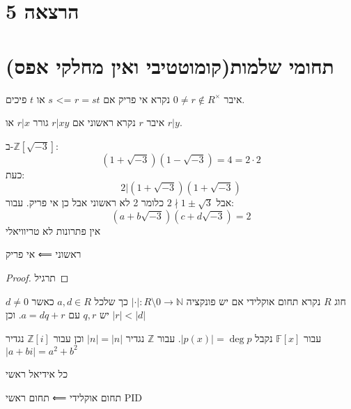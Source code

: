 \documentclass{tstextbook}
\begin{document}
\section{הרצאה 5}

\section{תחומי שלמות(קומוטטיבי ואין מחלקי אפס)}

\begin{definition}[אי פריק]
איבר \(0\neq r \not\in R^{\times}\) נקרא אי פריק אם \(r=st\) => \(s\) או \(t\) פיכים.

\end{definition}
\begin{definition}[ראשוני]
איבר \(r\) נקרא ראשוני אם \(r|xy\) גורר \(r|x\) או \(r|y\).

\end{definition}
\begin{example}
ב-\(\mathbb{Z}[\sqrt{ -3 }]\):
$$(1+\sqrt{ -3 })(1-\sqrt{ -3 })=4=2\cdot 2$$
כעת:
$$2|(1+\sqrt{ -3 })(1+\sqrt{ -3 })$$
אבל \(2\nmid 1\pm \sqrt{ 3 }\) כלומר 2 לא ראשוני אבל כן אי פריק. עבור:
$$(a+b\sqrt{ -3 })(c+d\sqrt{ -3 })=2$$
אין פתרונות לא טריוויאלי

\end{example}
\begin{proposition}
ראשוני ⟸ אי פריק

\end{proposition}
\begin{proof}
תרגיל

\end{proof}
\begin{definition}
חוג \(R\) נקרא תחום אוקלידי אם יש פונקציה \(\lvert \cdot \rvert:R\setminus 0 \to \mathbb{N}\) כך שלכל \(a,d \in R\) כאשר \(d\neq 0\) יש \(q,r\) עם \(a=dq+r\). וכן \(\lvert r \rvert<\lvert d \rvert\)

\end{definition}
\begin{example}
עבור \(\mathbb{F}[x]\) נקבל \(\lvert p(x) \rvert=\deg p\). עבור \(\mathbb{Z}\) נגדיר \(\lvert n \rvert=\lvert n \rvert\) וכן עבור \(\mathbb{Z}[i]\) נגדיר \(\lvert a+bi \rvert=a^{2}+b^{2}\)

\end{example}
\begin{definition}
כל אידיאל ראשי

\end{definition}
\begin{proposition}
תחום אוקלידי ⟸ תחום ראשי PID

\end{proposition}
\end{document}
